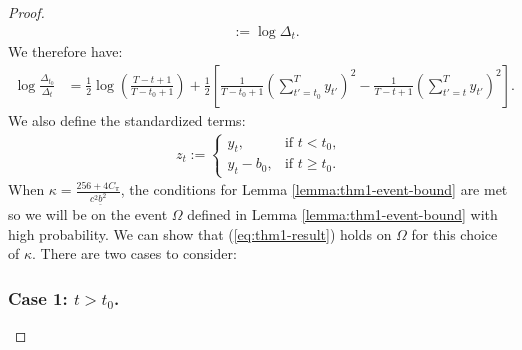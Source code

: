 \begin{proof}
\begin{align*}
    &:= \log \Delta_t.
\end{align*}
We therefore have:
\begin{align*}
    \log \frac{\Delta_{t_0}}{\Delta_t} &= \frac{1}{2} \log \left(\frac{T-t+1}{T-t_0+1}\right) + \frac{1}{2} \left[\frac{1}{T-t_0+1}\left(\sum_{t'=t_0}^{T} y_{t'}\right)^2- \frac{1}{T-t+1}\left(\sum_{t'=t}^{T} y_{t'}\right)^2\right].
\end{align*}
We also define the standardized terms:
\begin{align*}
    z_{t} :=
    \begin{cases}
        y_t, & \text{if } t < t_0, \\
        y_t - b_0, & \text{if } t \geq t_0.
    \end{cases}
\end{align*}
When $\kappa = \frac{256 + 4C_\pi}{c^2\underline{b}^2}$, the conditions for Lemma \ref{lemma:thm1-event-bound} are met so we will be on the event $\Omega$ defined in  Lemma \ref{lemma:thm1-event-bound} with high probability. We can show that (\ref{eq:thm1-result}) holds on $\Omega$ for this choice of $\kappa$. There are two cases to consider:

\subsubsection*{Case 1: $t > t_0$.}


\end{proof}
